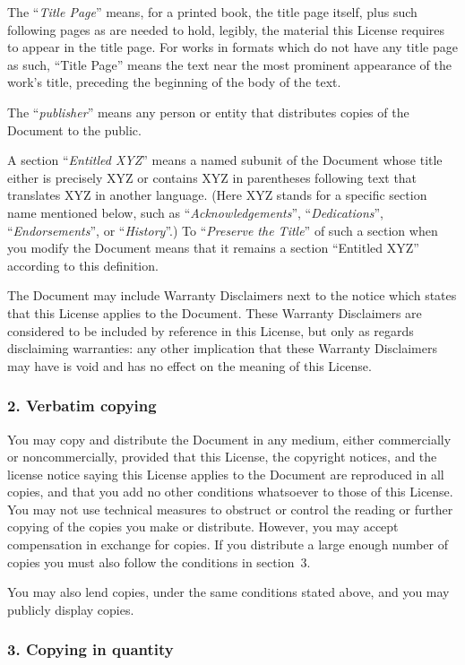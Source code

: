 \documentclass[a4paper,openany]{book}
\begin{document}
\begin{results}
The ``\emph{Title Page}'' means, for a printed book, the title page itself,
plus such following pages as are needed to hold, legibly, the material
this License requires to appear in the title page. For works in
formats which do not have any title page as such, ``Title Page'' means
the text near the most prominent appearance of the work's title,
preceding the beginning of the body of the text.

The ``\emph{publisher}'' means any person or entity that distributes
copies of the Document to the public.

A section ``\emph{Entitled XYZ}'' means a named subunit of the Document whose
title either is precisely XYZ or contains XYZ in parentheses following
text that translates XYZ in another language. (Here XYZ stands for a
specific section name mentioned below, such as ``\emph{Acknowledgements}'',
``\emph{Dedications}'', ``\emph{Endorsements}'', or ``\emph{History}''.)
To ``\emph{Preserve the Title}''
of such a section when you modify the Document means that it remains a
section ``Entitled XYZ'' according to this definition.

The Document may include Warranty Disclaimers next to the notice which
states that this License applies to the Document. These Warranty
Disclaimers are considered to be included by reference in this
License, but only as regards disclaiming warranties: any other
implication that these Warranty Disclaimers may have is void and has
no effect on the meaning of this License.

\subsubsection*{2. Verbatim copying}

You may copy and distribute the Document in any medium, either
commercially or noncommercially, provided that this License, the
copyright notices, and the license notice saying this License applies
to the Document are reproduced in all copies, and that you add no other
conditions whatsoever to those of this License. You may not use
technical measures to obstruct or control the reading or further
copying of the copies you make or distribute. However, you may accept
compensation in exchange for copies. If you distribute a large enough
number of copies you must also follow the conditions in section~3.

You may also lend copies, under the same conditions stated above, and
you may publicly display copies.

\subsubsection*{3. Copying in quantity}


\end{results}
\end{document}
